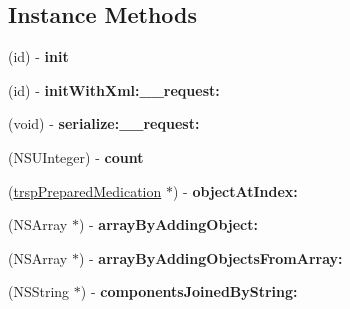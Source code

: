 \subsection*{Instance Methods}
\begin{DoxyCompactItemize}
\item 
\hypertarget{interfacesave_prepared_medications_ac14489fe17ae278c6b6c7cfa2465626e}{}(id) -\/ {\bfseries init}\label{interfacesave_prepared_medications_ac14489fe17ae278c6b6c7cfa2465626e}

\item 
\hypertarget{interfacesave_prepared_medications_a046d9f5958d944b248181822fc7b0d83}{}(id) -\/ {\bfseries init\+With\+Xml\+:\+\_\+\+\_\+request\+:}\label{interfacesave_prepared_medications_a046d9f5958d944b248181822fc7b0d83}

\item 
\hypertarget{interfacesave_prepared_medications_a5a39421b3a00addfb4db157ba03e529b}{}(void) -\/ {\bfseries serialize\+:\+\_\+\+\_\+request\+:}\label{interfacesave_prepared_medications_a5a39421b3a00addfb4db157ba03e529b}

\item 
\hypertarget{interfacesave_prepared_medications_adb13f747e0af05a2070391b87b768620}{}(N\+S\+U\+Integer) -\/ {\bfseries count}\label{interfacesave_prepared_medications_adb13f747e0af05a2070391b87b768620}

\item 
\hypertarget{interfacesave_prepared_medications_a0a6ede251dc96ccbc940de3f19fa38d0}{}(\hyperlink{interfacetrsp_prepared_medication}{trsp\+Prepared\+Medication} $\ast$) -\/ {\bfseries object\+At\+Index\+:}\label{interfacesave_prepared_medications_a0a6ede251dc96ccbc940de3f19fa38d0}

\item 
\hypertarget{interfacesave_prepared_medications_ae16818614d6440df223ab267acf9dd6d}{}(N\+S\+Array $\ast$) -\/ {\bfseries array\+By\+Adding\+Object\+:}\label{interfacesave_prepared_medications_ae16818614d6440df223ab267acf9dd6d}

\item 
\hypertarget{interfacesave_prepared_medications_acebb27788d4cf2470b94e2e3176ca583}{}(N\+S\+Array $\ast$) -\/ {\bfseries array\+By\+Adding\+Objects\+From\+Array\+:}\label{interfacesave_prepared_medications_acebb27788d4cf2470b94e2e3176ca583}

\item 
\hypertarget{interfacesave_prepared_medications_aa694e349c9b43525e171159792224196}{}(N\+S\+String $\ast$) -\/ {\bfseries components\+Joined\+By\+String\+:}\label{interfacesave_prepared_medications_aa694e349c9b43525e171159792224196}


\end{DoxyCompactItemize}
